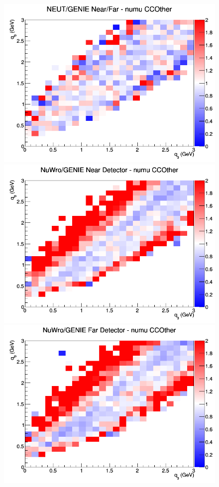 \documentclass[12pt]{article}
\begin{document}
\begin{figure}[h]
\endminipage
{}
\includegraphics[width=\linewidth]{eff_q0_q3/LAr/ratios/CCOther_NEUT_GENIE_numu_NF_q3_q0.png}
\endminipage
\newline
{}
\includegraphics[width=\linewidth]{eff_q0_q3/LAr/ratios/CCOther_NuWro_GENIE_numu_near_q3_q0.png}
\endminipage
{}
\includegraphics[width=\linewidth]{eff_q0_q3/LAr/ratios/CCOther_NuWro_GENIE_numu_far_q3_q0.png}

\end{figure}
\end{document}
